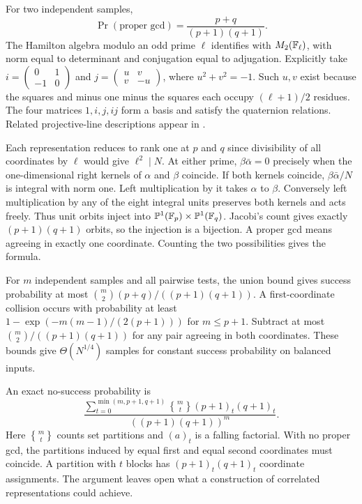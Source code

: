 For two independent samples,
\[
 \Pr(\text{proper gcd})=\frac{p+q}{(p+1)(q+1)} .
\]
The Hamilton algebra modulo an odd prime $\ell$ identifies with $M_2(\mathbb F_\ell)$, with norm equal to determinant and conjugation equal to adjugation. Explicitly take
$i=\left(\begin{smallmatrix}0&1\\-1&0\end{smallmatrix}\right)$ and
$j=\left(\begin{smallmatrix}u&v\\v&-u\end{smallmatrix}\right)$,
where $u^2+v^2=-1$. Such $u,v$ exist because the squares and minus one minus the squares each occupy $(\ell+1)/2$ residues. The four matrices $1,i,j,ij$ form a basis and satisfy the quaternion relations. Related projective-line descriptions appear in .

Each representation reduces to rank one at $p$ and $q$ since divisibility of all coordinates by $\ell$ would give $\ell^2\mid N$. At either prime, $\beta\bar\alpha=0$ precisely when the one-dimensional right kernels of $\alpha$ and $\beta$ coincide. If both kernels coincide, $\beta\bar\alpha/N$ is integral with norm one. Left multiplication by it takes $\alpha$ to $\beta$. Conversely left multiplication by any of the eight integral units preserves both kernels and acts freely. Thus unit orbits inject into $\mathbb P^1(\mathbb F_p)\times\mathbb P^1(\mathbb F_q)$. Jacobi's count gives exactly $(p+1)(q+1)$ orbits, so the injection is a bijection. A proper gcd means agreeing in exactly one coordinate. Counting the two possibilities gives the formula.

For $m$ independent samples and all pairwise tests, the union bound gives success probability at most $\binom m2(p+q)/((p+1)(q+1))$. A first-coordinate collision occurs with probability at least $1-\exp(-m(m-1)/(2(p+1)))$ for $m\le p+1$. Subtract at most $\binom m2/((p+1)(q+1))$ for any pair agreeing in both coordinates. These bounds give $\Theta(N^{1/4})$ samples for constant success probability on balanced inputs.

An exact no-success probability is
\[
 \frac{\displaystyle\sum_{t=0}^{\min(m,p+1,q+1)}
 {m\brace t}(p+1)_t(q+1)_t}{((p+1)(q+1))^m}.
\]
Here \({m\brace t}\) counts set partitions and $(a)_t$ is a falling factorial. With no proper gcd, the partitions induced by equal first and equal second coordinates must coincide. A partition with $t$ blocks has $(p+1)_t(q+1)_t$ coordinate assignments. The argument leaves open what a construction of correlated representations could achieve.
\newpage
